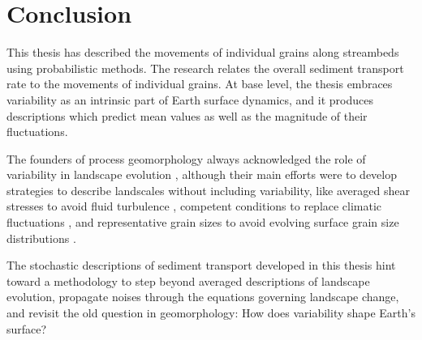 \section{Conclusion}

This thesis has described the movements of individual grains along streambeds using probabilistic methods.
The research relates the overall sediment transport rate to the movements of individual grains.
At base level, the thesis embraces variability as an intrinsic part of Earth surface dynamics, and it produces descriptions which predict mean values as well as the magnitude of their fluctuations.

The founders of process geomorphology always acknowledged the role of variability in landscape evolution \citep{Horton1945,Strahler1952,Langbein1964}, although their main efforts were to develop strategies to describe landscales without including variability, like averaged shear stresses to avoid fluid turbulence \citep{MeyerPeter1948,Bagnold1954}, competent conditions to replace climatic fluctuations \citep{Wolman1959,Wolman1978}, and representative grain sizes to avoid evolving surface grain size distributions \citep{Parker1982,Andrews1983}.

The stochastic descriptions of sediment transport developed in this thesis hint toward a methodology to step beyond averaged descriptions of landscape evolution, propagate noises through the equations governing landscape change, and revisit the old question in geomorphology: How does variability shape Earth's surface?

\endinput

Its closest neighbours may be rarefied hillslope transport, where solitary grains tumble down hillslopes \citep{Williams2021}, and intense bedload transport, where particles creep downstream in a dense granular flow, supported by collisions with other moving grains \citep{Frey2014}. These phenomena differ only by viscosity or density, not mechanically. 



\citet{Ashworth1989} and \citet{Warburton1992} identified three phases of bedload transport in gravel-bed streams that occur as the flow increases. Phase 1 is characterized by movement of sand only, while gravel remains stationary; phase 2 involves partial mobility of the smaller gravel sizes; and phase 3 is the full mobility of all grain sizes represented on the bed.
Phase 2 is most common in gravel-bed rivers, but phase 3 has 
